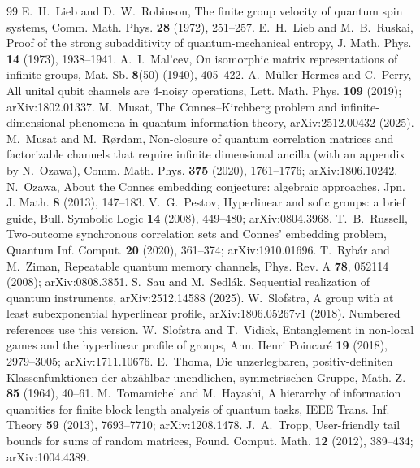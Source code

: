 \documentclass[11pt,a4paper]{article}
\theoremstyle{plain}
\theoremstyle{definition}
\theoremstyle{remark}
\begin{document}
\begin{thebibliography}{99}
 E.~H.~Lieb and D.~W.~Robinson, The finite group velocity of quantum spin systems, Comm. Math. Phys. \textbf{28} (1972), 251--257.
 E.~H.~Lieb and M.~B.~Ruskai, Proof of the strong subadditivity of quantum-mechanical entropy, J. Math. Phys. \textbf{14} (1973), 1938--1941.
 A.~I.~Mal'cev, On isomorphic matrix representations of infinite groups, Mat. Sb. \textbf{8}(50) (1940), 405--422.
 A.~M\"uller-Hermes and C.~Perry, All unital qubit channels are 4-noisy operations, Lett. Math. Phys. \textbf{109} (2019); arXiv:1802.01337.
 M.~Musat, The Connes--Kirchberg problem and infinite-dimensional phenomena in quantum information theory, arXiv:2512.00432 (2025).
 M.~Musat and M.~Rørdam, Non-closure of quantum correlation matrices and factorizable channels that require infinite dimensional ancilla (with an appendix by N.~Ozawa), Comm. Math. Phys. \textbf{375} (2020), 1761--1776; arXiv:1806.10242.
 N.~Ozawa, About the Connes embedding conjecture: algebraic approaches, Jpn. J. Math. \textbf{8} (2013), 147--183.
 V.~G.~Pestov, Hyperlinear and sofic groups: a brief guide, Bull. Symbolic Logic \textbf{14} (2008), 449--480; arXiv:0804.3968.
 T.~B.~Russell, Two-outcome synchronous correlation sets and Connes' embedding problem, Quantum Inf. Comput. \textbf{20} (2020), 361--374; arXiv:1910.01696.
 T.~Rybár and M.~Ziman, Repeatable quantum memory channels, Phys. Rev. A \textbf{78}, 052114 (2008); arXiv:0808.3851.
 S.~Sau and M.~Sedlák, Sequential realization of quantum instruments, arXiv:2512.14588 (2025).
 W.~Slofstra, A group with at least subexponential hyperlinear profile, \href{https://arxiv.org/abs/1806.05267v1}{arXiv:1806.05267v1} (2018). Numbered references use this version.
 W.~Slofstra and T.~Vidick, Entanglement in non-local games and the hyperlinear profile of groups, Ann. Henri Poincaré \textbf{19} (2018), 2979--3005; arXiv:1711.10676.
 E.~Thoma, Die unzerlegbaren, positiv-definiten Klassenfunktionen der abz\"ahlbar unendlichen, symmetrischen Gruppe, Math. Z. \textbf{85} (1964), 40--61.
 M.~Tomamichel and M.~Hayashi, A hierarchy of information quantities for finite block length analysis of quantum tasks, IEEE Trans. Inf. Theory \textbf{59} (2013), 7693--7710; arXiv:1208.1478.
 J.~A.~Tropp, User-friendly tail bounds for sums of random matrices, Found. Comput. Math. \textbf{12} (2012), 389--434; arXiv:1004.4389.

\end{thebibliography}
\end{document}
